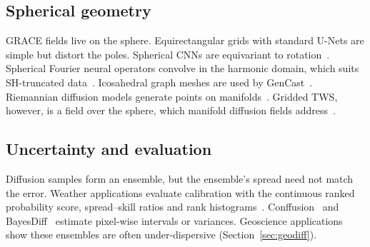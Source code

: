 \subsection{Spherical geometry}

GRACE fields live on the sphere. Equirectangular grids with standard U-Nets are simple but distort the poles. Spherical CNNs are equivariant to rotation~\cite{cohen2018spherical}. Spherical Fourier neural operators convolve in the harmonic domain, which suits SH-truncated data~\cite{bonev2023sfno}. Icosahedral graph meshes are used by GenCast~\cite{price2025gencast}. Riemannian diffusion models generate points on manifolds~\cite{debortoli2022riemannian,huang2022riemannian}. Gridded TWS, however, is a field over the sphere, which manifold diffusion fields address~\cite{elhag2024mdf}.

\subsection{Uncertainty and evaluation}

Diffusion samples form an ensemble, but the ensemble's spread need not match the error. Weather applications evaluate calibration with the continuous ranked probability score, spread--skill ratios and rank histograms~\cite{price2025gencast}. Conffusion~\cite{horwitz2022conffusion} and BayesDiff~\cite{kou2024bayesdiff} estimate pixel-wise intervals or variances. Geoscience applications show these ensembles are often under-dispersive (Section~\ref{sec:geodiff}).
